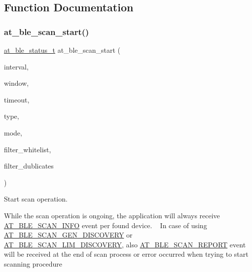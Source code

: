 \subsection{Function Documentation}
\mbox{\label{group__gap__scan__group_ga26972125714f8cee1bc5a59d5b82623f}} 
\subsubsection{\texorpdfstring{at\_ble\_scan\_start()}{at\_ble\_scan\_start()}}
{\footnotesize\ttfamily \mbox{\hyperlink{group__error__codes__group_ga3b1db9b95feb157b3c188ca27fe76988}{at\+\_\+ble\+\_\+status\+\_\+t}} at\+\_\+ble\+\_\+scan\+\_\+start (\begin{DoxyParamCaption}\item[{uint16\+\_\+t}]{interval,  }\item[{uint16\+\_\+t}]{window,  }\item[{uint16\+\_\+t}]{timeout,  }\item[{\mbox{\hyperlink{at__ble__api_8h_aaf0f86429cbfecd3e7aff55ca39c9121}{at\+\_\+ble\+\_\+scan\+\_\+type\+\_\+t}}}]{type,  }\item[{\mbox{\hyperlink{at__ble__api_8h_adfc2135fa2348d39943a1cf12b0e7d49}{at\+\_\+ble\+\_\+scan\+\_\+mode\+\_\+t}}}]{mode,  }\item[{\mbox{\hyperlink{group__group__sam0__utils_ga97a80ca1602ebf2303258971a2c938e2}{bool}}}]{filter\+\_\+whitelist,  }\item[{\mbox{\hyperlink{group__group__sam0__utils_ga97a80ca1602ebf2303258971a2c938e2}{bool}}}]{filter\+\_\+dublicates }\end{DoxyParamCaption})}



Start scan operation. 

While the scan operation is ongoing, the application will always receive \mbox{\hyperlink{at__ble__api_8h_a3324640b95f33169515f89738ed5baeba3cb207a61ee00b12381b45e27feb73c3}{A\+T\+\_\+\+B\+L\+E\+\_\+\+S\+C\+A\+N\+\_\+\+I\+N\+FO}} event per found device. ~\newline
 In case of using \mbox{\hyperlink{at__ble__api_8h_adfc2135fa2348d39943a1cf12b0e7d49a179fefcc66a56f66a5b45d5880def7cb}{A\+T\+\_\+\+B\+L\+E\+\_\+\+S\+C\+A\+N\+\_\+\+G\+E\+N\+\_\+\+D\+I\+S\+C\+O\+V\+E\+RY}} or \mbox{\hyperlink{at__ble__api_8h_adfc2135fa2348d39943a1cf12b0e7d49a4e114ee867376665b1a9312ffa2089c9}{A\+T\+\_\+\+B\+L\+E\+\_\+\+S\+C\+A\+N\+\_\+\+L\+I\+M\+\_\+\+D\+I\+S\+C\+O\+V\+E\+RY}}, also \mbox{\hyperlink{at__ble__api_8h_a3324640b95f33169515f89738ed5baeba7520b73374f9552caf9457201c3cdbc0}{A\+T\+\_\+\+B\+L\+E\+\_\+\+S\+C\+A\+N\+\_\+\+R\+E\+P\+O\+RT}} event will be received at the end of scan process or error occurred when trying to start scanning procedure


